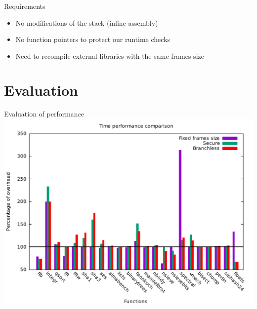 \documentclass{beamer}
\begin{document}
\begin{frame}[fragile]{Requirements}
	\begin{itemize}\itemsep16pt
		\item No modifications of the stack (inline assembly)
		\item No function pointers to protect our runtime checks
		\item Need to recompile external libraries with the same frames size
	\end{itemize}
\end{frame}

\section{Evaluation}
\label{sec:Implementation}

\begin{frame}[c]{Evaluation of performance }
	\includegraphics[width=\textwidth]{images/time_percentage_graph.pdf}
\end{frame}
\end{document}
